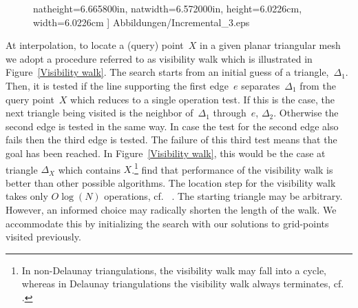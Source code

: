 \documentclass[a4paper,12pt]{article}%
\begin{document}
\begin{figure}[htb]
\begin{tabular}
{natheight=6.665800in,
natwidth=6.572000in,
height=6.0226cm,
width=6.0226cm
]%
{Abbildungen/Incremental_3.eps}%
}
\\
%
\end{tabular}
\label{Delaunay Triangulation Computational}%
\end{figure}%


At interpolation, to locate a (query) point~$X$ in a given planar triangular
mesh we adopt a procedure referred to as visibility walk which is illustrated
in Figure~\ref{Visibility walk}. The search starts from an initial guess of a
triangle,~$\Delta_{1}$. Then, it is tested if the line supporting the first
edge~$e$ separates~$\Delta_{1}$ from the query point~$X$ which reduces to a
single operation test. If this is the case, the next triangle being visited is
the neighbor of~$\Delta_{1}$ through~$e$, $\Delta_{2}$. Otherwise the second
edge is tested in the same way. In case the test for the second edge also
fails then the third edge is tested. The failure of this third test means that
the goal has been reached. In Figure~\ref{Visibility walk}, this would be the
case at triangle $\Delta_{X}$ which contains $X$.\footnote{In non-Delaunay
triangulations, the visibility walk may fall into a cycle, whereas in Delaunay
triangulations the visibility walk always terminates, cf. ~%
%
.}
find that performance of the visibility walk is better than other possible
algorithms. The location step for the visibility walk takes only $O\log\left(
N\right)  $ operations, cf.~%
%
. The starting triangle may be arbitrary. However, an informed choice may
radically shorten the length of the walk. We accommodate this by initializing
the search with our solutions to grid-points visited previously.%
\end{document}
